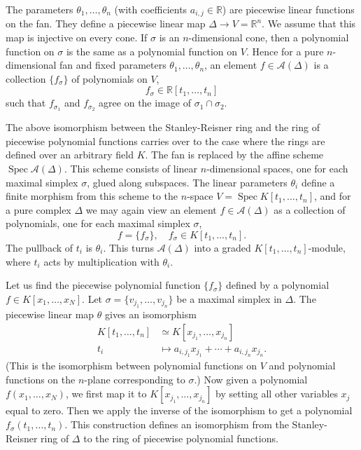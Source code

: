 \documentclass[10pt]{article}
\theoremstyle{definition}
\newcommand{\RR}{{\mathbb{R}}}
\newcommand{\cA}{{\mathcal A}}
\newcommand{\Spec}{\operatorname{Spec}}
\newcommand{\isom}{\simeq}
\renewcommand{\a}[1]{a_{#1}}
\begin{document}
The parameters $\theta_1, \ldots, \theta_n$ (with coefficients $\a{i,j} \in\RR$) are piecewise linear functions on the fan. They define  a piecewise linear map $\Delta \to V =\RR^n$. We assume that this map is injective on every cone. If $\sigma$ is an $n$-dimensional cone, then a polynomial function on $\sigma$ is the same as a polynomial function on $V$. Hence for a pure $n$-dimensional fan and fixed parameters $\theta_1,\ldots,\theta_n$, an element $f\in \cA(\Delta)$ is a collection $\{ f_\sigma \}$ of polynomials on $V$,
\[ f_\sigma \in \RR[t_1,\ldots,t_n]\]
such that $f_{\sigma_1}$ and $f_{\sigma_2}$ agree on the image of $\sigma_1\cap \sigma_2$.

The above isomorphism between the Stanley-Reisner ring and the ring of piecewise polynomial functions carries over to the case where the rings are defined over an arbitrary field $K$. The fan is replaced by the affine scheme $\Spec \cA(\Delta)$. This scheme consists of linear $n$-dimensional spaces, one for each maximal simplex $\sigma$, glued along subspaces. The linear parameters $\theta_i$ define a finite morphism from this scheme to the $n$-space $V = \Spec K[t_1,\ldots, t_n]$, and for a pure complex $\Delta$ we may again view an element $f\in \cA(\Delta)$ as a collection of polynomials, one for each maximal simplex $\sigma$, 
\[ f=  \{ f_\sigma \}, \quad f_\sigma \in K[t_1,\ldots, t_n]. \]
The pullback of $t_i$ is $\theta_i$. This turns $\cA(\Delta)$ into a graded $K[t_1,\ldots, t_n]$-module, where $t_i$ acts by multiplication with $\theta_i$.

Let us  find the piecewise polynomial function $\{ f_\sigma \}$ defined by a polynomial $f\in  K[x_1,\ldots,x_N]$. 
Let $\sigma = \{v_{j_1},\ldots,v_{j_n}\}$ be a maximal simplex in $\Delta$. The piecewise linear map $\theta$ gives an isomorphism 
\begin{align} \label{eq-isom}
 K[t_1,\ldots,t_n] &\isom K[x_{j_1},\ldots, x_{j_n}] \\ \nonumber
 t_i &\mapsto  \a{i,  j_1} x_{j_1} + \cdots + \a{i,  j_n} x_{j_n}.
 \end{align} 
(This is the isomorphism between polynomial functions on $V$ and polynomial functions on the $n$-plane corresponding to $\sigma$.) Now given a polynomial $f(x_1,\ldots, x_N)$, we first map it to $K[x_{j_1},\ldots, x_{j_n}]$ by setting all other variables $x_j$ equal to zero. Then we apply the inverse of the isomorphism to get a polynomial $f_\sigma(t_1,\ldots, t_n)$. This construction defines an isomorphism from the Stanley-Reisner ring of $\Delta$ to the ring of piecewise polynomial functions.
\end{document}

